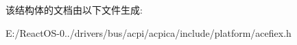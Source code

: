该结构体的文档由以下文件生成\+:\begin{DoxyCompactItemize}
\item 
E\+:/\+React\+O\+S-\/0../drivers/bus/acpi/acpica/include/platform/acefiex.\+h\end{DoxyCompactItemize}
